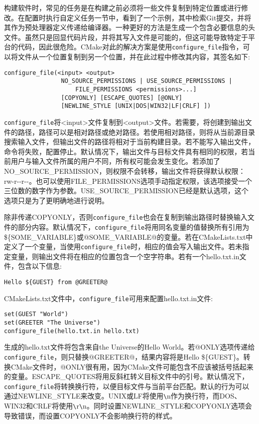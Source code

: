 构建软件时，常见的任务是在构建之前必须将一些文件复制到特定位置或进行修改。在配置时执行自定义任务一节中，看到了一个示例，其中检索Git提交，并将其作为预处理器定义传递给编译器。一种更好的方法是生成一个包含必要信息的头文件。虽然只是回显代码片段，并将其写入文件是可能的，但这可能导致特定于平台的代码，因此很危险。CMake对此的解决方案是使用\texttt{configure\_file}指令，可以将文件从一个位置复制到另一个位置，并在此过程中修改其内容，其签名如下:

\begin{lstlisting}[style=styleCMake]
configure_file(<input> <output>
				NO_SOURCE_PERMISSIONS | USE_SOURCE_PERMISSIONS |
					FILE_PERMISSIONS <permissions>...]
				[COPYONLY] [ESCAPE_QUOTES] [@ONLY]
				[NEWLINE_STYLE [UNIX|DOS|WIN32|LF|CRLF] ])
\end{lstlisting}

\texttt{configure\_file}将<input>文件复制到<output>文件。若需要，将创建到输出文件的路径，路径可以是相对路径或绝对路径。若使用相对路径，则将从当前源目录搜索输入文件，但输出文件的路径将相对于当前构建目录。若不能写入输出文件，命令将失败，配置停止。默认情况下，输出文件与目标文件具有相同的权限，若当前用户与输入文件所属的用户不同，所有权可能会发生变化。若添加了NO\_SOURCE\_PERMISSION，则权限不会转移，输出文件将获得默认权限：rw-r-{}-r-{}-。也可以使用FILE\_PERMISSIONS选项手动指定权限，该选项接受一个三位数的数字作为参数。USE\_SOURCE\_PERMISSION已经是默认选项，这个选项只是为了更明确地进行说明。

除非传递COPYONLY，否则\texttt{configure\_file}也会在复制到输出路径时替换输入文件的部分内容。默认情况下，\texttt{configure\_file}将用同名变量的值替换所有引用为\$\{SOME\_VARIABLE\}或@SOME\_VARIABLE@的变量。若在CMakeLists.txt中定义了一个变量，当使用\texttt{configure\_file}时，相应的值会写入输出文件。若未指定变量，则输出文件将在相应的位置包含一个空字符串。若有一个hello.txt.in文件，包含以下信息:

\begin{lstlisting}[style=styleCMake]
Hello ${GUEST} from @GREETER@
\end{lstlisting}

CMakeLists.txt文件中，\texttt{configure\_file}可用来配置hello.txt.in文件:

\begin{lstlisting}[style=styleCMake]
set(GUEST "World")
set(GREETER "The Universe")
configure_file(hello.txt.in hello.txt)
\end{lstlisting}

生成的hello.txt文件将包含来自the Universe的Hello World。若@ONLY选项传递给\texttt{configure\_file}，则只替换@GREETER@，结果内容将是Hello \$\{GUEST\}。转换CMake文件时，@ONLY很有用，因为CMake文件可能包含不应该被括号括起来的变量。ESCAPE\_QUOTES将用反斜杠转义目标文件中的引号。默认情况下，\texttt{configure\_file}将转换换行符，以便目标文件与当前平台匹配。默认的行为可以通过NEWLINE\_STYLE来改变。UNIX或LF将使用\verb|\|n作为换行符，而DOS、WIN32和CRLF将使用\verb|\|r\verb|\|n。同时设置NEWLINE\_STYLE和COPYONLY选项会导致错误，而设置COPYONLY不会影响换行符的样式。

